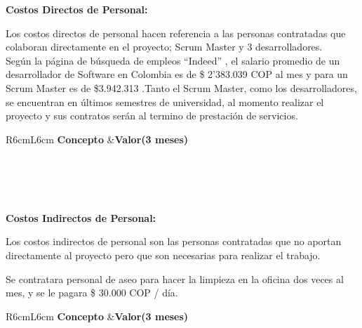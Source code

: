 \documentclass[a4paper,12 pt]{article}
\begin{document}
\textbf{Costos Directos de Personal:}

Los costos directos de personal hacen referencia a las personas contratadas que
colaboran directamente en el proyecto; Scrum Master y 3 desarrolladores.\\

Según la página de búsqueda de empleos “Indeed” \cite{01}, el salario promedio
de un desarrollador de Software en Colombia es de \$ 2’383.039 COP al mes y para
un Scrum Master es de \$3.942.313 .Tanto el Scrum Master, como los
desarrolladores, se encuentran en últimos semestres de universidad, al momento
realizar el proyecto y sus contratos serán al termino de prestación de
servicios. 

\begin{table}[H]
    \centering
    \small{
    \begin{tabular}{R{6cm}L{6cm}}
        \textbf{Concepto}   &\textbf{Valor(3 meses)}\\
        \\
         \\
         \\
        \hline
         \\
    \end{tabular}
    \label{T04}}
\end{table}{}


\textbf{Costos Indirectos de Personal:}


Los costos indirectos de personal son las personas contratadas que no aportan
directamente al proyecto pero que son necesarias para realizar el trabajo.

Se contratara personal de aseo para hacer la limpieza en la oficina dos veces al
mes, y se le pagara \$ 30.000 COP / día.

\begin{table}[H]
    \centering
    \small{
    \begin{tabular}{R{6cm}L{6cm}}
        \textbf{Concepto}   &\textbf{Valor(3 meses)}\\
        \\
         \\
        \hline
         \\
    \end{tabular}
    \label{T201}}
\end{table}{}
\end{document}
